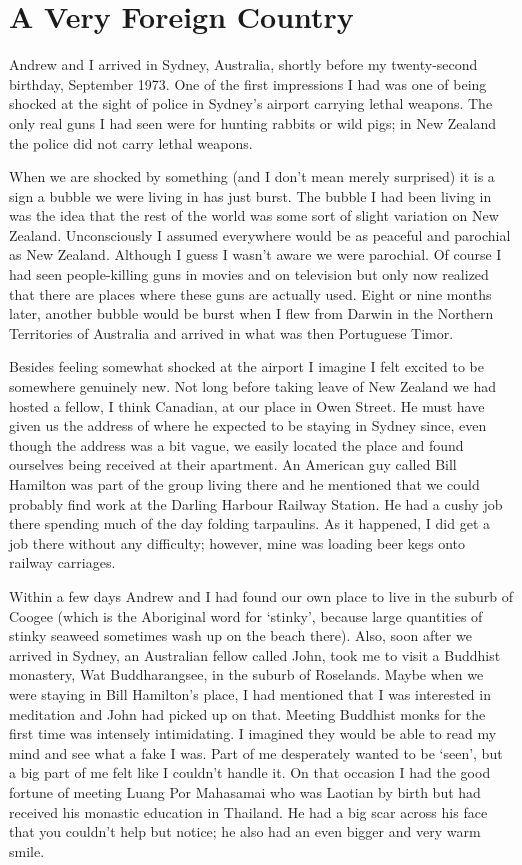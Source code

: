 \chapter{A Very Foreign Country}

Andrew and I arrived in Sydney, Australia, shortly before my twenty-second
birthday, September 1973. One of the first impressions I had was one of
being shocked at the sight of police in Sydney's airport carrying lethal
weapons. The only real guns I had seen were for hunting rabbits or wild
pigs; in New Zealand the police did not carry lethal weapons.

When we are shocked by something (and I don't mean merely surprised) it
is a sign a bubble we were living in has just burst. The bubble I had
been living in was the idea that the rest of the world was some sort of
slight variation on New Zealand. Unconsciously I assumed everywhere
would be as peaceful and parochial as New Zealand. Although I guess I
wasn't aware we were parochial. Of course I had seen people-killing guns
in movies and on television but only now realized that there are places
where these guns are actually used. Eight or nine months later, another
bubble would be burst when I flew from Darwin in the Northern
Territories of Australia and arrived in what was then Portuguese Timor.

Besides feeling somewhat shocked at the airport I imagine I felt excited
to be somewhere genuinely new. Not long before taking leave of New
Zealand we had hosted a fellow, I think Canadian, at our place in Owen
Street. He must have given us the address of where he expected to be
staying in Sydney since, even though the address was a bit vague, we
easily located the place and found ourselves being received at their
apartment. An American guy called Bill Hamilton was part of the group
living there and he mentioned that we could probably find work at the
Darling Harbour Railway Station. He had a cushy job there spending much
of the day folding tarpaulins. As it happened, I did get a job there
without any difficulty; however, mine was loading beer kegs onto railway
carriages.

Within a few days Andrew and I had found our own place to live in the
suburb of Coogee (which is the Aboriginal word for `stinky', because
large quantities of stinky seaweed sometimes wash up on the beach
there). Also, soon after we arrived in Sydney, an Australian fellow
called John, took me to visit a Buddhist monastery, Wat Buddharangsee,
in the suburb of Roselands. Maybe when we were staying in Bill
Hamilton's place, I had mentioned that I was interested in meditation
and John had picked up on that. Meeting Buddhist monks for the first
time was intensely intimidating. I imagined they would be able to read
my mind and see what a fake I was. Part of me desperately wanted to be
`seen', but a big part of me felt like I couldn't handle it. On that
occasion I had the good fortune of meeting Luang Por Mahasamai who
was Laotian by birth but had received his monastic education in
Thailand. He had a big scar across his face that you couldn't help but
notice; he also had an even bigger and very warm smile.

